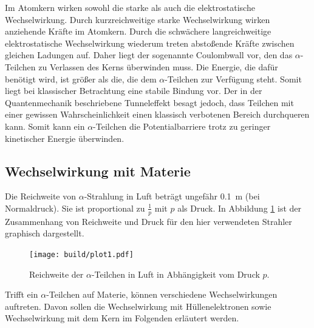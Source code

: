Im Atomkern wirken sowohl die starke als auch die elektrostatische Wechselwirkung. Durch kurzreichweitige starke Wechselwirkung wirken anziehende Kräfte im Atomkern. Durch die schwächere langreichweitige elektrostatische Wechselwirkung wiederum treten abstoßende Kräfte zwischen gleichen Ladungen auf. Daher liegt der sogenannte Coulombwall vor, den das $\alpha$-Teilchen zu Verlassen des Kerns überwinden muss. Die Energie, die dafür benötigt wird, ist größer als die, die dem $\alpha$-Teilchen zur Verfügung steht. Somit liegt bei klassischer Betrachtung eine stabile Bindung vor. Der in der Quantenmechanik beschriebene Tunneleffekt besagt jedoch, dass Teilchen mit einer gewissen Wahrscheinlichkeit einen klassisch verbotenen Bereich durchqueren kann. Somit kann ein $\alpha$-Teilchen die Potentialbarriere trotz zu geringer kinetischer Energie überwinden.

\subsection{Wechselwirkung mit Materie}
Die Reichweite von $\alpha$-Strahlung in Luft beträgt ungefähr \SI{0.1}{\meter} (bei Normaldruck). Sie ist proportional zu $\frac{1}{p}$ mit $p$ als Druck. In Abbildung \ref{fig:luft} ist der Zusammenhang von Reichweite und Druck für den hier verwendeten Strahler graphisch dargestellt.

\begin{figure}
	\centering
  \texttt{[image: build/plot1.pdf]}
	\caption{Reichweite der $\alpha$-Teilchen in Luft in Abhängigkeit vom Druck $p$.}
	\label{fig:luft}
\end{figure}

Trifft ein $\alpha$-Teilchen auf Materie, können verschiedene Wechselwirkungen auftreten. Davon sollen die Wechselwirkung mit Hüllenelektronen sowie Wechselwirkung mit dem Kern im Folgenden erläutert werden.
